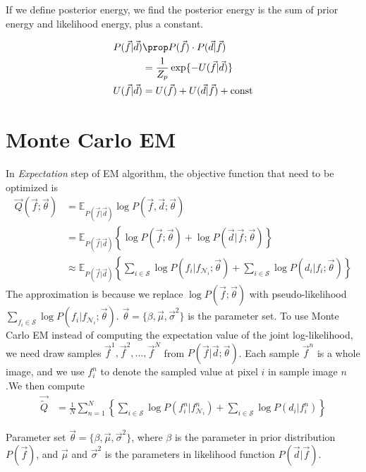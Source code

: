 \documentclass{article}
\begin{document}
If we define posterior energy, we find the posterior energy is the sum of prior energy and likelihood energy, plus a constant.

\begin{align*}
  P(\vec f | \vec d) &\prop P(\vec f) \cdot P(\vec d | \vec f) \\
  &= \frac{1}{Z_p} \exp \{ -U(\vec f | \vec d)\} \\
  U(\vec f | \vec d) &= U(\vec f) + U(\vec d | \vec f) + \mathrm{const}
\end{align*}

\section{Monte Carlo EM}

In \emph{Expectation} step of EM algorithm, the objective function that need to be optimized is
\begin{align*}
  \vec Q (\vec f; \vec \theta)  &=\mathbb{E}_{P(\vec f | \vec d)} \log P(\vec f, \vec d; \vec \theta)\\
  &= \mathbb{E}_{P(\vec f | \vec d)} \left \{ \log P(\vec f; \vec \theta) + \log P(\vec d | \vec f; \vec \theta )\right \} \\
  &\approx \mathbb{E}_{P(\vec f | \vec d)} \left \{ \sum_{i \in \mathcal{S}} \log P(f_i | f_{\mathcal{N}_i}; \vec \theta) + \sum_{i \in \mathcal{S}} \log P(d_i | f_i; \vec \theta) \right \}
\end{align*}
The approximation is because we replace  $\log P(\vec f; \vec \theta)$ with pseudo-likelihood $\sum_{f_i \in \mathcal{S}} \log P(f_i | f_{\mathcal{N}_i}; \vec \theta)$. $\vec \theta = \{ \beta, \vec \mu, \vec \sigma^2 \}$ is the parameter set.
To use Monte Carlo EM instead of computing the expectation value of the joint log-likelihood, we need draw samples $\vec f^1, \vec f^2, \dots, \vec f^N$ from $P(\vec f | \vec d; \vec \theta)$. Each sample $\vec f^n$ is a whole image, and we use $f_i^n$ to denote the sampled value at pixel $i$ in sample image $n$.We then compute
\begin{align*}
  \vec {\widetilde Q} &= \frac{1}{N}\sum_{n=1}^N \left \{ \sum_{i \in \mathcal{S}} \log P(f_i^n | f^n_{\mathcal{N}_i}) + \sum_{i \in \mathcal{S}} \log P(d_i | f_i^n) \right \}
\end{align*}

Parameter set $\vec \theta = \{\beta, \vec \mu, \vec \sigma^2\}$, where $\beta$ is the parameter in prior distribution $P(\vec f)$, and $\vec \mu$ and $\vec \sigma^2$ is the parameters in likelihood function $P(\vec d| \vec f)$. 
\end{document}
